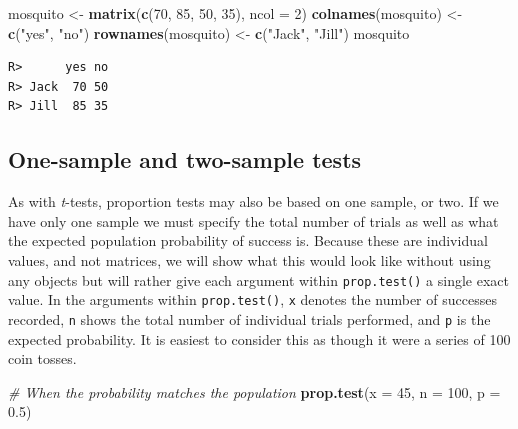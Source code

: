 \documentclass[english,10pt,a4paper,oneside]{book}
\newenvironment{Shaded}{\begin{snugshade}}{\end{snugshade}}
\newcommand{\CommentTok}[1]{\textcolor[rgb]{0.56,0.35,0.01}{\textit{#1}}}
\newcommand{\DataTypeTok}[1]{\textcolor[rgb]{0.13,0.29,0.53}{#1}}
\newcommand{\DecValTok}[1]{\textcolor[rgb]{0.00,0.00,0.81}{#1}}
\newcommand{\FloatTok}[1]{\textcolor[rgb]{0.00,0.00,0.81}{#1}}
\newcommand{\KeywordTok}[1]{\textcolor[rgb]{0.13,0.29,0.53}{\textbf{#1}}}
\newcommand{\NormalTok}[1]{#1}
\newcommand{\StringTok}[1]{\textcolor[rgb]{0.31,0.60,0.02}{#1}}
\theoremstyle{definition}
\theoremstyle{definition}
\theoremstyle{definition}
\theoremstyle{remark}
\begin{document}
\begin{Shaded}
\begin{Highlighting}[]
\NormalTok{mosquito <-}\StringTok{ }\KeywordTok{matrix}\NormalTok{(}\KeywordTok{c}\NormalTok{(}\DecValTok{70}\NormalTok{, }\DecValTok{85}\NormalTok{, }\DecValTok{50}\NormalTok{, }\DecValTok{35}\NormalTok{), }\DataTypeTok{ncol =} \DecValTok{2}\NormalTok{)}
\KeywordTok{colnames}\NormalTok{(mosquito) <-}\StringTok{ }\KeywordTok{c}\NormalTok{(}\StringTok{"yes"}\NormalTok{, }\StringTok{"no"}\NormalTok{)}
\KeywordTok{rownames}\NormalTok{(mosquito) <-}\StringTok{ }\KeywordTok{c}\NormalTok{(}\StringTok{"Jack"}\NormalTok{, }\StringTok{"Jill"}\NormalTok{)}
\NormalTok{mosquito}
\end{Highlighting}
\end{Shaded}

\begin{verbatim}
R>      yes no
R> Jack  70 50
R> Jill  85 35
\end{verbatim}

\hypertarget{one-sample-and-two-sample-tests}{%
\subsection{One-sample and two-sample
tests}\label{one-sample-and-two-sample-tests}}

As with \emph{t}-tests, proportion tests may also be based on one
sample, or two. If we have only one sample we must specify the total
number of trials as well as what the expected population probability of
success is. Because these are individual values, and not matrices, we
will show what this would look like without using any objects but will
rather give each argument within \texttt{prop.test()} a single exact
value. In the arguments within \texttt{prop.test()}, \texttt{x} denotes
the number of successes recorded, \texttt{n} shows the total number of
individual trials performed, and \texttt{p} is the expected probability.
It is easiest to consider this as though it were a series of 100 coin
tosses.

\begin{Shaded}
\begin{Highlighting}[]
\CommentTok{# When the probability matches the population}
\KeywordTok{prop.test}\NormalTok{(}\DataTypeTok{x =} \DecValTok{45}\NormalTok{, }\DataTypeTok{n =} \DecValTok{100}\NormalTok{, }\DataTypeTok{p =} \FloatTok{0.5}\NormalTok{)}
\end{Highlighting}
\end{Shaded}
\end{document}
